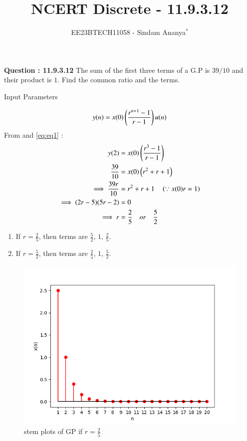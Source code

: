 \documentclass[journal,12pt,twocolumn]{IEEEtran}
\theoremstyle{remark}
\begin{document}

\vspace{3cm}

\title{NCERT Discrete - 11.9.3.12}
\author{EE23BTECH11058 - Sindam Ananya$^{*}$%
}
\maketitle
\newpage
\bigskip

\renewcommand{\thefigure}{\theenumi}
\renewcommand{\thetable}{\theenumi}

\vspace{3cm}
\textbf{Question : 11.9.3.12} 
The sum of the first three terms of a G.P is $39/10$ and their product is $1$. Find the common ratio and the terms.\\
\solution
\begin{table}[h!]
    \centering
    
    \caption{Input Parameters}
    \label{tab:table1}
\end{table}
\begin{equation}
y(n) = x(0)\left(\frac{r^{n+1}-1}{r-1}\right)u(n)
\label{eq:eq1}
\end{equation}
From  and \eqref{eq:eq1} :
\begin{align}
y(2) &= x(0)\left(\frac{r^3-1}{r-1}\right)\\
\frac{39}{10} &= x(0)\left(r^2+r+1\right)\\
\implies \frac{39r}{10} &= r^2+r+1 \quad \left(\because x(0)r = 1\right)\\
\implies (2r-5)(5r-2) &=0\\
\implies r &= \frac{2}{5} \quad or \quad \frac{5}{2}
\end{align}
\begin{enumerate}
      \item If $r = \frac{2}{5}$, then terms are $\frac{5}{2}$, $1$, $\frac{2}{5}$.
      \item If $r = \frac{5}{2}$, then terms are $\frac{2}{5}$, $1$, $\frac{5}{2}$.
\end{enumerate}
\begin{figure}[h!]
    \centering
    \includegraphics[width=\columnwidth]{figs/graph1.png}
    \caption{stem plots of GP if $r=\frac{2}{5}$}
    \label{fig:1}
\end{figure}
\end{document}
